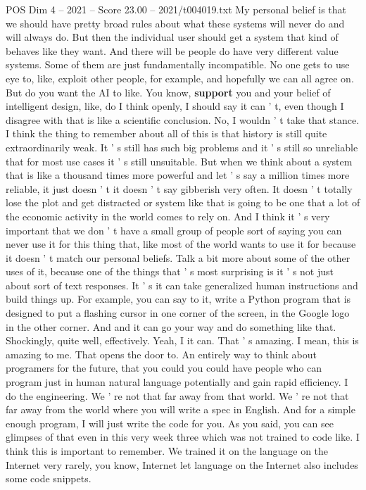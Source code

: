 \begin{textsample}{POS Dim 4 – 2021 – Score 23.00 – 2021/t004019.txt}
My personal belief is that we should have pretty broad rules about what these systems will never do and will always do.
But then the individual user should get a system that kind of behaves like they want.
And there will be people do have very different value systems.
Some of them are just fundamentally incompatible.
No one gets to use eye to, like, exploit other people, for example, and hopefully we can all agree on.
But do you want the AI to like.
You know, \textbf{support} you and your belief of intelligent design, like, do I think openly, I should say it can ' t, even though I disagree with that is like a scientific conclusion.
No, I wouldn ' t take that stance.
I think the thing to remember about all of this is that history is still quite extraordinarily weak.
It ' s still has such big problems and it ' s still so unreliable that for most use cases it ' s still unsuitable.
But when we think about a system that is like a thousand times more powerful and let ' s say a million times more reliable, it just doesn ' t it doesn ' t say gibberish very often.
It doesn ' t totally lose the plot and get distracted or system like that is going to be one that a lot of the economic activity in the world comes to rely on.
And I think it ' s very important that we don ' t have a small group of people sort of saying you can never use it for this thing that, like most of the world wants to use it for because it doesn ' t match our personal beliefs.
Talk a bit more about some of the other uses of it, because one of the things that ' s most surprising is it ' s not just about sort of text responses.
It ' s it can take generalized human instructions and build things up.
For example, you can say to it, write a Python program that is designed to put a flashing cursor in one corner of the screen, in the Google logo in the other corner.
And and it can go your way and do something like that.
Shockingly, quite well, effectively.
Yeah, I it can.
That ' s amazing.
I mean, this is amazing to me.
That opens the door to.
An entirely way to think about programers for the future, that you could you could have people who can program just in human natural language potentially and gain rapid efficiency.
I do the engineering.
We ' re not that far away from that world.
We ' re not that far away from the world where you will write a spec in English.
And for a simple enough program, I will just write the code for you.
As you said, you can see glimpses of that even in this very week three which was not trained to code like.
I think this is important to remember.
We trained it on the language on the Internet very rarely, you know, Internet let language on the Internet also includes some code snippets.

\end{textsample}

